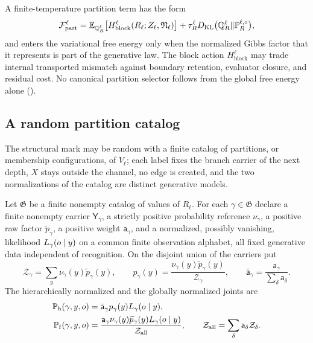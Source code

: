 A finite-temperature partition term has the form
\begin{equation}
\mathcal F^\ell_{\mathrm{part}}
=\mathbb E_{\mathbb Q^\ell_R}\bigl[H^\ell_{\mathrm{block}}(R_\ell;Z_\ell,\mathfrak N_\ell)\bigr]
+\tau^\ell_RD_{\mathrm{KL}}\bigl(\mathbb Q^\ell_R\Vert\mathbb P^{\ell,\circ}_R\bigr),
\label{eq:full-graph-partition-free-energy}
\end{equation}
and enters the variational free energy only when the normalized Gibbs factor that it
represents is part of the generative law. The block action
$H^\ell_{\mathrm{block}}$ may trade internal transported mismatch against boundary
retention, evaluator closure, and residual cost. No canonical partition selector
follows from the global free energy alone ().

\subsection{A random partition catalog}
\label{sec:rg-geometry-normalization}

The structural mark may be random with a finite catalog of partitions, or membership
configurations, of $V_\ell$; each label fixes the branch carrier of the next depth,
$X$ stays outside the channel, no edge is created, and the two normalizations of the
catalog are distinct generative models.

Let $\mathfrak G$ be a finite nonempty catalog of values of $R_\ell$. For each
$\gamma\in\mathfrak G$ declare a finite nonempty carrier $\mathsf Y_\gamma$, a
strictly positive probability reference $\nu_\gamma$, a positive raw factor
$\widetilde p_\gamma$, a positive weight $\mathsf a_\gamma$, and a normalized,
possibly vanishing, likelihood $L_\gamma(o\mid y)$ on a common finite observation
alphabet, all fixed generative data independent of recognition. On the disjoint union
of the carriers put
\begin{equation}
\mathcal Z_\gamma=\sum_y\nu_\gamma(y)\widetilde p_\gamma(y),
\qquad
p_\gamma(y)=\frac{\nu_\gamma(y)\widetilde p_\gamma(y)}{\mathcal Z_\gamma},
\qquad
\bar{\mathsf a}_\gamma=\frac{\mathsf a_\gamma}{\sum_\delta\mathsf a_\delta}.
\label{eq:rg-geometry-branch}
\end{equation}
The hierarchically normalized and the globally normalized joints are
\begin{align}
\mathbb P_{\mathrm h}(\gamma,y,o)
&=\bar{\mathsf a}_\gamma p_\gamma(y)L_\gamma(o\mid y),
\label{eq:rg-geometry-hierarchy}\\
\mathbb P_{\mathrm f}(\gamma,y,o)
&=\frac{\mathsf a_\gamma\nu_\gamma(y)\widetilde p_\gamma(y)L_\gamma(o\mid y)}{\mathcal Z_{\mathrm{all}}},
\qquad
\mathcal Z_{\mathrm{all}}=\sum_\delta\mathsf a_\delta\mathcal Z_\delta .
\label{eq:rg-geometry-factor}
\end{align}

